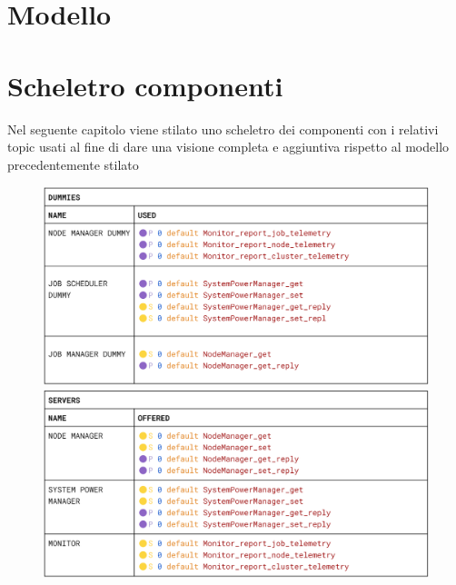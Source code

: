 \section{Modello}
\section{Scheletro componenti}
Nel seguente capitolo viene stilato uno scheletro dei componenti con i relativi topic usati al fine di dare una visione completa e aggiuntiva rispetto al modello precedentemente stilato  
\begin{figure}[H]
    \centering
    \includegraphics[width=\textwidth]{./img/dummies_skeleton.png}
    \includegraphics[width=\textwidth]{./img/server_skeleton.png}
\end{figure}
